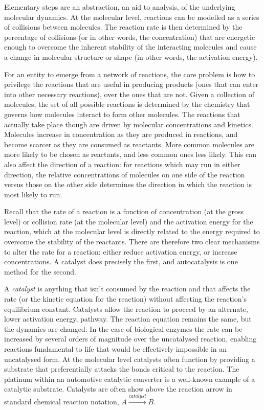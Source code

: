 Elementary steps are an abstraction, an aid to analysis, of the underlying molecular dynamics. At the molecular level, reactions can be
modelled as a series of collisions between molecules. The reaction rate is then determined by the percentage of collisions (or in other words,
the concentration) that are energetic enough to overcome the inherent stability of the interacting molecules and cause a change in molecular
structure or shape (in other words, the activation energy).

For an entity to emerge from a network of reactions, the core problem is how to privilege the reactions that are useful in producing products (ones that can enter into other necessary reactions), over the ones that are not. Given a collection of molecules, the set of all possible reactions is determined by the chemistry that governs how molecules interact to form other molecules. The reactions that actually take place though are driven by molecular concentrations and kinetics. Molecules increase in concentration as they are produced in reactions, and become scarcer as they are consumed as reactants. More common molecules are more likely to be chosen as reactants, and less common ones less likely. This can also affect the direction of a reaction: for reactions which may run in either direction, the relative concentrations of molecules on one side of the reaction versus those on the other side determines the direction in which the reaction is most likely to run.

Recall that the rate of a reaction is a function of concentration (at the gross level) or collision rate (at the molecular level) and the
activation energy for the reaction, which at the molecular level is directly related to the energy required to overcome the stability of the
reactants. There are therefore two clear mechanisms to alter the rate for a reaction: either reduce activation energy, or increase
concentrations. A catalyst does precisely the first, and autocatalysis is one method for the second.

A \emph{catalyst} is anything that isn't consumed by the reaction and that affects the rate (or the kinetic equation for the reaction) without
affecting the reaction's equilibrium constant. Catalysts allow the reaction to proceed by an alternate, lower activation energy, pathway.
The reaction equation remains the same, but the dynamics are changed. In the case of biological enzymes the rate can be increased by several
orders of magnitude over the uncatalysed reaction, enabling reactions fundamental to life that would be effectively impossible in an
uncatalysed form. At the molecular level catalysts often function by providing a substrate that preferentially attacks the bonds critical to
the reaction. The platinum within an automotive catalytic converter is a well-known example of a catalytic substrate. Catalysts are often show above the reaction arrow in standard chemical reaction notation, \eg$A\xrightarrow{catalyst} B$.

